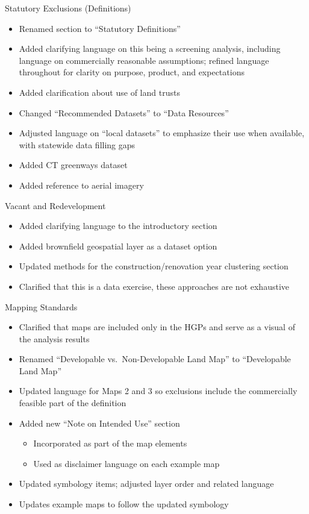 \documentclass[
  letterpaper,
  DIV=11,
  numbers=noendperiod]{scrreprt}
\providecommand{\tightlist}{%
  \setlength{\itemsep}{0pt}\setlength{\parskip}{0pt}}
\begin{document}
Statutory Exclusions (Definitions)

\begin{itemize}
\tightlist
\item
  Renamed section to ``Statutory Definitions''
\item
  Added clarifying language on this being a screening analysis,
  including language on commercially reasonable assumptions; refined
  language throughout for clarity on purpose, product, and expectations
\item
  Added clarification about use of land trusts
\item
  Changed ``Recommended Datasets'' to ``Data Resources''
\item
  Adjusted language on ``local datasets'' to emphasize their use when
  available, with statewide data filling gaps
\item
  Added CT greenways dataset
\item
  Added reference to aerial imagery
\end{itemize}

Vacant and Redevelopment

\begin{itemize}
\tightlist
\item
  Added clarifying language to the introductory section
\item
  Added brownfield geospatial layer as a dataset option
\item
  Updated methods for the construction/renovation year clustering
  section
\item
  Clarified that this is a data exercise, these approaches are not
  exhaustive
\end{itemize}

Mapping Standards

\begin{itemize}
\tightlist
\item
  Clarified that maps are included only in the HGPs and serve as a
  visual of the analysis results
\item
  Renamed ``Developable vs.~Non-Developable Land Map'' to ``Developable
  Land Map''
\item
  Updated language for Maps 2 and 3 so exclusions include the
  commercially feasible part of the definition
\item
  Added new ``Note on Intended Use'' section

  \begin{itemize}
  \tightlist
  \item
    Incorporated as part of the map elements
  \item
    Used as disclaimer language on each example map
  \end{itemize}
\item
  Updated symbology items; adjusted layer order and related language
\item
  Updates example maps to follow the updated symbology
\end{itemize}
\end{document}
